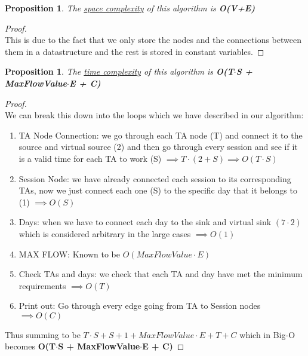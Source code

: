 \documentclass[12pt]{article}
\newtheorem{proposition}[theorem]{Proposition}
\begin{document}
\begin{proposition}
\label{numq}
The \underline{space complexity} of this algorithm is \textbf{O(V+E)}
\end{proposition}

\begin{proof}
~ \\ \indent This is due to the fact that we only store the nodes and the connections between
them in a datastructure and the rest is stored in constant variables.
\end{proof}

\begin{proposition}
\label{numq}
The \underline{time complexity} of this algorithm is \textbf{O(T$\cdot$S + MaxFlowValue$\cdot$E + C)}
\end{proposition}

\begin{proof}
~ \\ \indent We can break this down into the loops which we have described in our algorithm:
\begin{enumerate}
    \item TA Node Connection: we go through each TA node (T) and connect it to the source and
        virtual source (2) and then go through every session and see if it is a valid time
        for each TA to work (S) $\implies T\cdot (2+S) \implies O(T\cdot S)$
    \item Session Node: we have already connected each session to its corresponding TAs, now
        we just connect each one (S) to the specific day that it belongs to (1) $\implies O(S)$
    \item Days: when we have to connect each day to the sink and virtual sink $(7\cdot 2)$ which
        is considered arbitrary in the large cases $\implies O(1)$
    \item MAX FLOW: Known to be $O(MaxFlowValue\cdot E)$
    \item Check TAs and days: we check that each TA and day have met the minimum requirements
        $\implies O(T)$
    \item Print out: Go through every edge going from TA to Session nodes $\implies O(C)$
\end{enumerate}
Thus summing to be $T\cdot S + S + 1 + MaxFlowValue\cdot E + T + C$ which in Big-O becomes
\textbf{O(T$\cdot$S + MaxFlowValue$\cdot$E + C)}
\end{proof}




\end{document}
